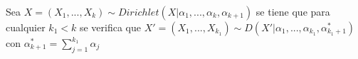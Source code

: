 		\begin{thm}
			Sea $X = (X_1, ... , X_k) \sim Dirichlet(X|\alpha_1, ... , \alpha_k, \alpha_{k+1}) $ se tiene que para cualquier $k_1 < k$  se verifica que $X' =  (X_1, ... , X_{k_1}) \sim D(X'|\alpha_1, ... , \alpha_{k_1}, \alpha_{k_1 + 1}^{*}) $ con  $\alpha_{k+1}^{*} =\sum_{j=1}^{k_1} {\alpha_{j}}$
		\end{thm}
